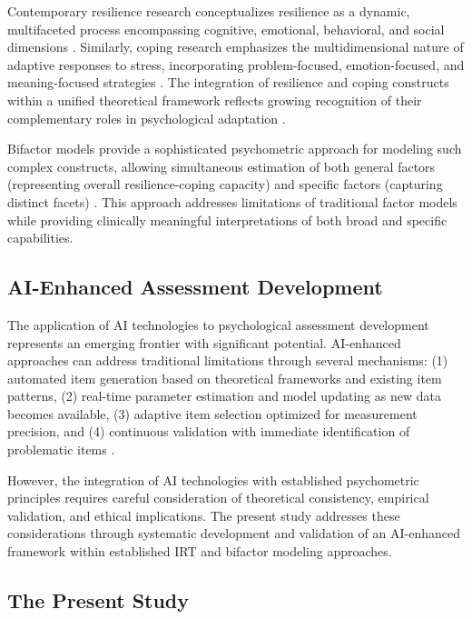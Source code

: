 \documentclass[12pt,a4paper]{article}
\begin{document}
Contemporary resilience research conceptualizes resilience as a dynamic, multifaceted process encompassing cognitive, emotional, behavioral, and social dimensions \cite{Bonanno2004, Masten2014}. Similarly, coping research emphasizes the multidimensional nature of adaptive responses to stress, incorporating problem-focused, emotion-focused, and meaning-focused strategies \cite{Lazarus1984, Folkman2000}. The integration of resilience and coping constructs within a unified theoretical framework reflects growing recognition of their complementary roles in psychological adaptation \cite{Southwick2014}.

Bifactor models provide a sophisticated psychometric approach for modeling such complex constructs, allowing simultaneous estimation of both general factors (representing overall resilience-coping capacity) and specific factors (capturing distinct facets) \cite{Reise2012, Rodriguez2016}. This approach addresses limitations of traditional factor models while providing clinically meaningful interpretations of both broad and specific capabilities.

\subsection{AI-Enhanced Assessment Development}

The application of AI technologies to psychological assessment development represents an emerging frontier with significant potential. AI-enhanced approaches can address traditional limitations through several mechanisms: (1) automated item generation based on theoretical frameworks and existing item patterns, (2) real-time parameter estimation and model updating as new data becomes available, (3) adaptive item selection optimized for measurement precision, and (4) continuous validation with immediate identification of problematic items \cite{Embretson2016, Zumbo2019}.

However, the integration of AI technologies with established psychometric principles requires careful consideration of theoretical consistency, empirical validation, and ethical implications. The present study addresses these considerations through systematic development and validation of an AI-enhanced framework within established IRT and bifactor modeling approaches.

\subsection{The Present Study}
\end{document}
